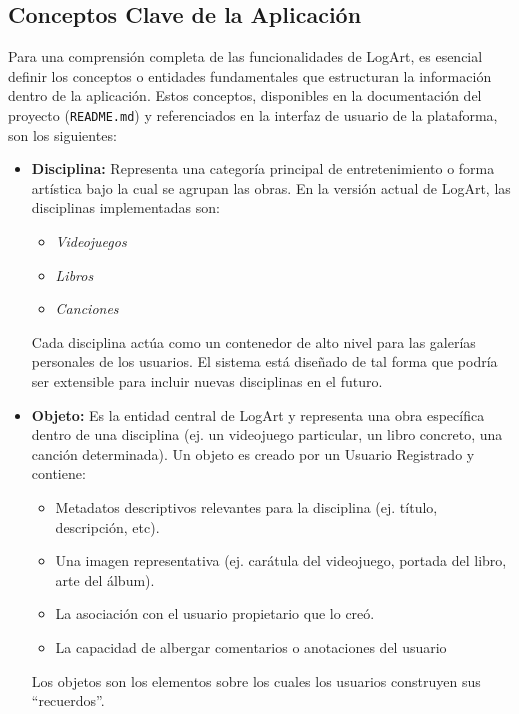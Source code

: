 \subsection{Conceptos Clave de la Aplicación}
\label{ssec:conceptosClave}

Para una comprensión completa de las funcionalidades de LogArt, es esencial definir los conceptos o entidades fundamentales que estructuran la información dentro de la aplicación. Estos conceptos, disponibles en la documentación del proyecto (\texttt{README.md}) y referenciados en la interfaz de usuario de la plataforma, son los siguientes:

\begin{itemize}
    \item \textbf{Disciplina:}
    Representa una categoría principal de entretenimiento o forma artística bajo la cual se agrupan las obras. En la versión actual de LogArt, las disciplinas implementadas son:
    \begin{itemize}
        \item \textit{Videojuegos}
        \item \textit{Libros}
        \item \textit{Canciones}
    \end{itemize}
    Cada disciplina actúa como un contenedor de alto nivel para las galerías personales de los usuarios. El sistema está diseñado de tal forma que podría ser extensible para incluir nuevas disciplinas en el futuro.

    \vspace{0.5cm}

    \item \textbf{Objeto:}
    Es la entidad central de LogArt y representa una obra específica dentro de una disciplina (ej. un videojuego particular, un libro concreto, una canción determinada). Un objeto es creado por un Usuario Registrado y contiene:
    \begin{itemize}
        \item Metadatos descriptivos relevantes para la disciplina (ej. título, descripción, etc).
        \item Una imagen representativa (ej. carátula del videojuego, portada del libro, arte del álbum).
        \item La asociación con el usuario propietario que lo creó.
        \item La capacidad de albergar comentarios o anotaciones del usuario
    \end{itemize}
    Los objetos son los elementos sobre los cuales los usuarios construyen sus ``recuerdos''.


\end{itemize}
